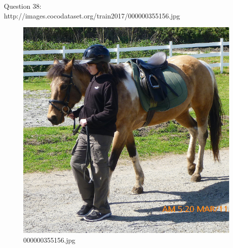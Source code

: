     Question 38:\\http://images.cocodataset.org/train2017/000000355156.jpg
    \begin{figure}[h]
        \centering
        \includegraphics[width=0.8\linewidth]{../image set/easy/000000355156.jpg}
        \caption{000000355156.jpg}
    \end{figure}
